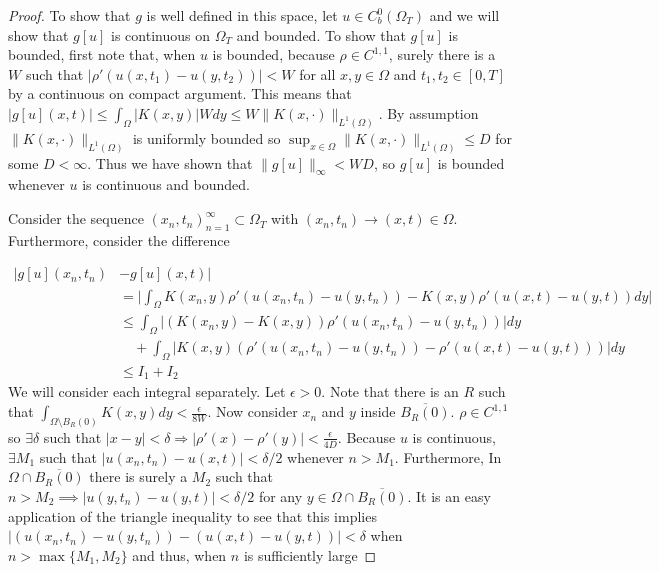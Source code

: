 \documentclass[aps,
preprint,
groupedaddress,
showkeys,
amsmath]{revtex4-2}
\begin{document}
    \begin{proof}
        To show that $g$ is well defined in this space, let $u\in C^0_b(\Omega_T)$ and we will show that $g[u]$ is continuous on $\Omega_T$ and bounded. To show that $g[u]$ is bounded, first note that, when $u$ is bounded, because $\rho\in C^{1,1}$, surely there is a $W$ such that $|\rho'(u(x,t_1)-u(y,t_2))|<W$ for all $x,y\in \Omega$ and $t_1,t_2\in [0,T]$ by a continuous on compact argument. This means that $|g[u](x,t)|\leq \int_\Omega |K(x,y)|Wdy\leq W\|K(x,\cdot)\|_{L^1(\Omega)}$. By assumption $\|K(x,\cdot)\|_{L^1(\Omega)}$  is uniformly bounded so $\sup_{x\in\Omega}\|K(x,\cdot)\|_{L^1(\Omega)}\leq D$ for some $D<\infty$. Thus we have shown that $\|g[u]\|_\infty<WD$, so $g[u]$ is bounded whenever $u$ is continuous and bounded.

        Consider the sequence ${(x_n,t_n)}_{n=1}^\infty\subset\Omega_T$ with $(x_n,t_n)\rightarrow (x,t)\in\Omega$. Furthermore, consider the difference 

        \begin{equation*}
        \begin{split}
        |g[u](x_n,t_n)&-g[u](x,t)|\\
        &=\bigg|\int_\Omega K(x_n,y)\rho'(u(x_n,t_n)-u(y,t_n))-K(x,y)\rho'(u(x,t)-u(y,t))dy\bigg|\\
            &\leq \int_\Omega|(K(x_n,y)-K(x,y))\rho'(u(x_n,t_n)-u(y,t_n))|dy\\
            &\quad +\int_\Omega |K(x,y)(\rho'(u(x_n,t_n)-u(y,t_n))-\rho'(u(x,t)-u(y,t)))|dy\\
            &\leq I_1+I_2
            \end{split}
        \end{equation*}
        We will consider each integral separately. Let $\epsilon>0$. Note that there is an $R$ such that $\int_{\Omega\setminus B_{R}(0)}K(x,y)dy<\frac{\epsilon}{8W}$. Now consider $x_n$ and $y$ inside $\overline{B_R(0)}.$ $\rho\in C^{1,1}$ so $\exists \delta$ such that $|x-y|<\delta \Rightarrow |\rho'(x)-\rho'(y)|<\frac{\epsilon}{4D}$. Because $u$ is continuous, $\exists M_1$ such that $|u(x_n,t_n)-u(x,t)|<\delta/2$ whenever $n>M_1$. Furthermore, In $\Omega\cap \overline{B_R(0)}$ there is surely a $M_2$  such that $n>M_2\implies |u(y,t_n)-u(y,t)|<\delta/2$ for any $y\in \Omega\cap\overline{B_R(0)}$. It is an easy application of the triangle inequality to see that this implies $|(u(x_n,t_n)-u(y,t_n))-(u(x,t)-u(y,t))|<\delta$ when $n>\max\{M_1,M_2\}$ and thus, when $n$ is sufficiently large
        

\end{proof}
\end{document}
